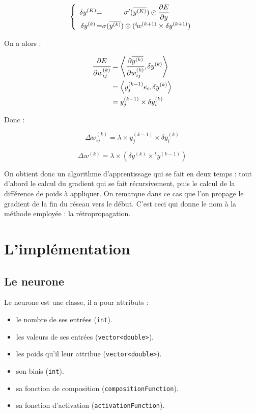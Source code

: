 \[
\left \{
\begin{array}{c @{=} c}
    \delta y^{(K)} & \sigma'(\overline{y^{(K)}}) \odot \cfrac{\partial E}{\partial y}\\
    \delta y^{(k)} & \sigma(\overline{y^{(k)}}) \odot ({}^t \! w^{(k+1)} \times \delta y^{(k+1)})\\
\end{array}
\right.
\]

On a alors :

\begin{align*}
\cfrac{\partial E}{\partial w_{ij}^{(k)}} &= \left\langle\cfrac{\partial \overline{y^{(k)}}}{\partial w_{ij}^{(k)}} ,\delta y^{(k)}\right\rangle\\
&= \left\langle y^{(k-1)}_j e_i,\delta y^{(k)}\right\rangle\\
& = y^{(k-1)}_j \times \delta y^{(k)}_i
\end{align*}

Donc :

\[\Delta w^{(k)}_{ij} = \lambda \times y^{(k-1)}_j \times \delta y^{(k)}_i\]

\[\Delta w^{(k)} = \lambda \times (\delta y^{(k)} \times {}^t \! y^{(k-1)})\]

On obtient donc un algorithme d'apprentissage qui se fait en deux temps : tout
d'abord le calcul du gradient qui se fait récursivement, puis le calcul de la
différence de poids à appliquer. On remarque dans ce cas que l'on propage le
gradient de la fin du réseau vers le début. C'est ceci qui donne le nom à la
méthode employée : la rétropropagation.

\section{L'implémentation}

\subsection{Le neurone}

Le neurone est une classe, il a pour attributs :
\begin{itemize}
  \item le nombre de ses entrées (\verb+int+).
  \item les valeurs de ses entrées (\verb+vector<double>+).
  \item les poids qu'il leur attribue (\verb+vector<double>+).
  \item son biais (\verb+int+).
  \item sa fonction de composition (\verb+compositionFunction+).
  \item sa fonction d'activation (\verb+activationFunction+).
\end{itemize}


